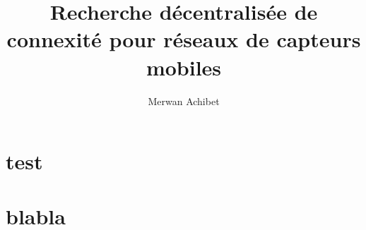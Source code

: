 \documentclass[11pt, two column]{article}
\title{Recherche décentralisée de connexité pour réseaux de capteurs mobiles}
\author{Merwan Achibet}
\date{}
\begin{document}
\maketitle

\section{test}

\section{blabla}



\end{document}
